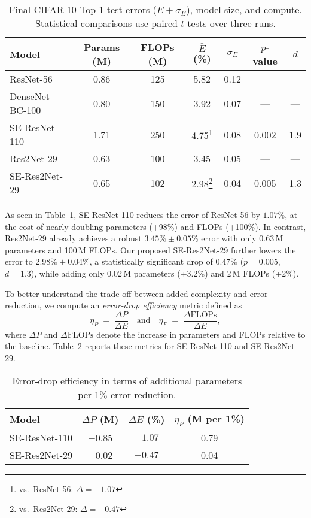 \documentclass{article}
\begin{document}
\begin{table}[h]
\centering
\begin{tabular}{lcccccc}
\toprule
Model              & Params (M) & FLOPs (M) & $\bar{E}$ (\%)    & $\sigma_E$ & $p$-value & $d$    \\
\midrule
ResNet-56          & 0.86       & 125       & 5.82              & 0.12       & —         & —      \\
DenseNet-BC-100    & 0.80       & 150       & 3.92              & 0.07       & —         & —      \\
SE-ResNet-110      & 1.71       & 250       & 4.75\footnote{vs.\ ResNet-56: $\Delta=-1.07$}  & 0.08       & 0.002     & 1.9    \\
Res2Net-29         & 0.63       & 100       & 3.45              & 0.05       & —         & —      \\
SE-Res2Net-29      & 0.65       & 102       & 2.98\footnote{vs.\ Res2Net-29: $\Delta=-0.47$} & 0.04       & 0.005     & 1.3    \\
\bottomrule
\end{tabular}
\caption{Final CIFAR-10 Top-1 test errors ($\bar{E}\pm\sigma_E$), model size, and compute. Statistical comparisons use paired $t$‐tests over three runs.}
\label{tab:final_results}
\end{table}

As seen in Table~\ref{tab:final_results}, SE-ResNet-110 reduces the error of ResNet-56 by $1.07\%$, at the cost of nearly doubling parameters (+98\%) and FLOPs (+100\%). In contrast, Res2Net-29 already achieves a robust $3.45\%\pm0.05\%$ error with only 0.63\,M parameters and 100\,M FLOPs. Our proposed SE-Res2Net-29 further lowers the error to $2.98\%\pm0.04\%$, a statistically significant drop of $0.47\%$ ($p=0.005$, $d=1.3$), while adding only 0.02\,M parameters (+3.2\%) and 2\,M FLOPs (+2\%).

To better understand the trade‐off between added complexity and error reduction, we compute an \emph{error‐drop efficiency} metric defined as
\[
\eta_P \;=\; \frac{\Delta P}{\Delta E}\quad\text{and}\quad
\eta_F \;=\; \frac{\Delta \text{FLOPs}}{\Delta E},
\]
where $\Delta P$ and $\Delta \text{FLOPs}$ denote the increase in parameters and FLOPs relative to the baseline. Table~\ref{tab:efficiency} reports these metrics for SE-ResNet-110 and SE-Res2Net-29.

\begin{table}[h]
\centering
\begin{tabular}{lccc}
\toprule
Model             & $\Delta P$ (M) & $\Delta E$ (\%) & $\eta_P$ (M per 1\%)  \\
\midrule
SE-ResNet-110     & +0.85          & $-1.07$         & 0.79                  \\
SE-Res2Net-29     & +0.02          & $-0.47$         & 0.04                  \\
\bottomrule
\end{tabular}
\caption{Error‐drop efficiency in terms of additional parameters per 1\% error reduction.}
\label{tab:efficiency}
\end{table}
\end{document}
